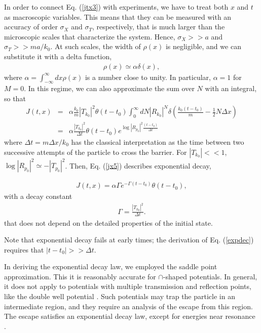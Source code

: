 \documentclass[12pt]{article}
\numberwithin{equation}{section}
\begin{document}
In order to connect Eq. (\ref{jtx3}) with experiments, we have to treat both $x$ and $t$ as macroscopic variables. This means that they can be measured with an accuracy of order $\sigma_X$ and $\sigma_T$, respectively, that is much larger than the microscopic scales that characterize the system. Hence, $\sigma_X >> a$ and $\sigma_T >> ma/k_0$. At such scales, the width of $\rho(x)$ is negligible, and we can substitute it with a delta function,
\begin{eqnarray}
\rho(x) \simeq \alpha \delta(x), \label{Markovtunel}
\end{eqnarray}
where $\alpha = \int_{-\infty}^{\infty}dx \rho(x)$ is a number close to unity. In particular,  $\alpha =1 $ for $M = 0$. In this regime, we can also approximate the sum over $N$ with an integral, so that
\begin{eqnarray}
J(t,x) &=& \alpha \frac{k_0}{m} |T_{k_0}|^2  \theta(t-t_0) \int_0^{\infty}dN |R_{k_0}|^N \delta\left(\frac{k_0(t - t_0 )}{m} - \frac{1}{2} N\Delta x  \right)\nonumber \\  &=& \alpha \frac{|T_{k_0}|^2}{\Delta t}  \theta(t-t_0) e^{\log |R_{p_0}|^2 \frac{(t-t_0)}{\Delta t}} \label{jx5}
\end{eqnarray}
where  $\Delta t = m \Delta x/k_0$ has the classical interpretation as the time between two successive attempts of the particle to cross the barrier. For $|T_{k_0}| << 1$, $\log|R_{p_0}|^2 \simeq -|T_{p_0}|^2$. Then, Eq. (\ref{jx5}) describes exponential decay,

\begin{eqnarray}
J(t,x) =  \alpha \Gamma  e^{-\Gamma  (t-t_0) } \theta (t-t_0), \label{expdec}
\end{eqnarray}
 with a decay constant
\begin{eqnarray}
\Gamma = \frac{ |T_{k_0}|^2}{\Delta t}. \label{Gammat}
\end{eqnarray}
that does not depend on the detailed properties of the initial state.


Note that  exponential decay fails at early times; the derivation of  Eq. (\ref{expdec}) requires that $|t - t_0 |>> \Delta t$.


In deriving the exponential decay law, we employed the saddle point approximation. This it is reasonably accurate for   $\cap$-shaped potentials. In general, it does not
apply  to potentials with multiple transmission and reflection points, like the double well potential \cite{Matsu}. Such potentials may trap the particle in an intermediate region, and they require an analysis of the escape from this region. The  escape satisfies an exponential decay law, except for energies near resonance \cite{AnSav13}.
\end{document}
